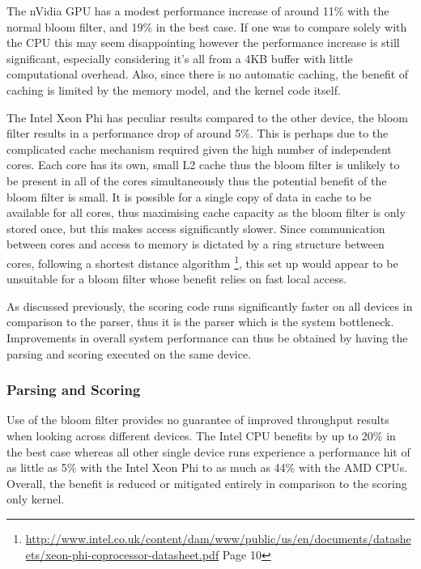 The nVidia GPU has a modest performance increase of around 11\% with the normal
bloom filter, and 19\% in the best case. If one was to compare solely with the
CPU this may seem disappointing however the performance increase is still
significant, especially considering it's all from a 4KB buffer with little
computational overhead. Also, since there is no automatic caching, the benefit
of caching is limited by the memory model, and the kernel code itself.

The Intel Xeon Phi has peculiar results compared to the other device, the bloom
filter results in a performance drop of around 5\%. This is perhaps due to the
complicated cache mechanism required given the high number of independent cores.
Each core has its own, small L2 cache thus the bloom filter is unlikely to be
present in all of the cores simultaneously thus the potential benefit of the
bloom filter is small. It is possible for a single copy of data in cache to be
available for all cores, thus maximising cache capacity as the bloom filter is
only stored once, but this makes access significantly slower. Since
communication between cores and access to memory is dictated by a ring structure
between cores, following a shortest distance algorithm
\footnote{\url{http://www.intel.co.uk/content/dam/www/public/us/en/documents/datasheets/xeon-phi-coprocessor-datasheet.pdf}
Page 10}, this set up would appear to be unsuitable for a bloom filter whose
benefit relies on fast local access.

As discussed previously, the scoring code runs significantly faster on all
devices in comparison to the parser, thus it is the parser which is the system
bottleneck. Improvements in overall system performance can thus be obtained by
having the parsing and scoring executed on the same device.

\subsubsection{Parsing and Scoring}

Use of the bloom filter provides no guarantee of improved throughput results
when looking across different devices. The Intel CPU benefits by up to 20\% in
the best case whereas all other single device runs experience a performance hit
of as little as 5\% with the Intel Xeon Phi to as much as 44\% with the AMD
CPUs. Overall, the benefit is reduced or mitigated entirely in comparison to the
scoring only kernel.

